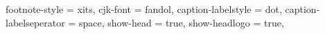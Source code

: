 {{      %
    footnote-style = xits,
    cjk-font = fandol,
    caption-labelstyle = dot,
    caption-labelseperator = space,
    show-head = true,
    show-headlogo = true,
}}
